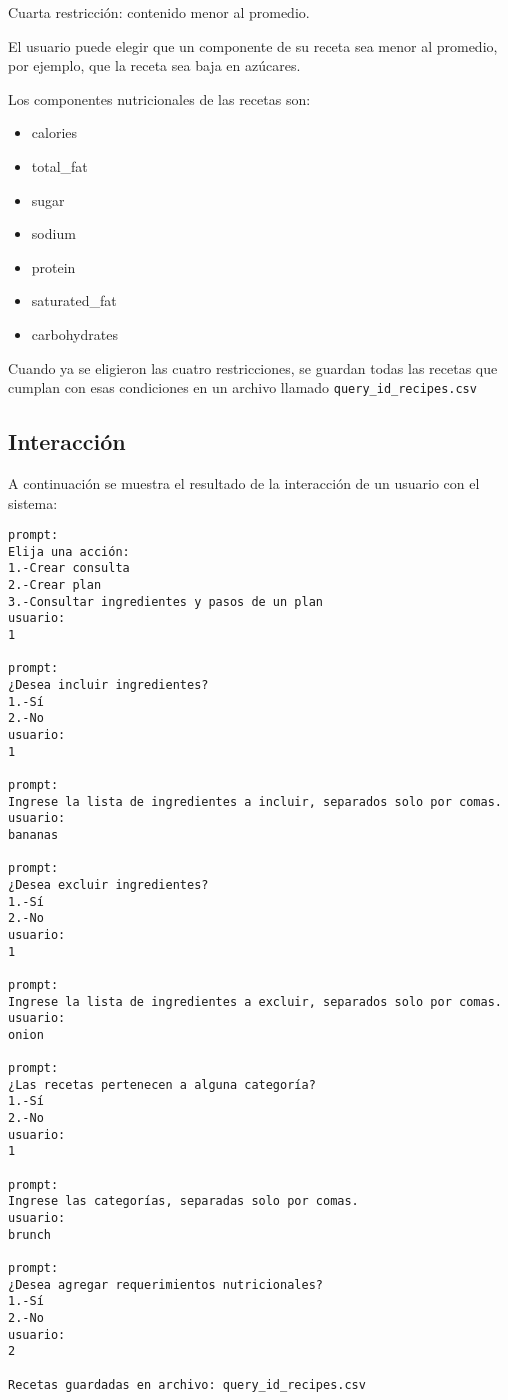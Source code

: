\documentclass{article}
\begin{document}
Cuarta restricción: contenido menor al promedio.

El usuario puede elegir que un componente de su receta sea menor al promedio, por ejemplo, que la receta sea baja en azúcares.

Los componentes nutricionales de las recetas son:
\begin{itemize}
\item calories
\item total\_fat
\item sugar
\item sodium
\item protein
\item saturated\_fat
\item carbohydrates
\end{itemize}

Cuando ya se eligieron las cuatro restricciones, se guardan todas las recetas que cumplan con esas condiciones en un archivo llamado \texttt{query\_id\_recipes.csv}

\subsection{Interacción}

A continuación se muestra el resultado de la interacción de un usuario con el sistema:

\begin{verbatim}
prompt:
Elija una acción:
1.-Crear consulta
2.-Crear plan
3.-Consultar ingredientes y pasos de un plan
usuario:
1

prompt:
¿Desea incluir ingredientes?
1.-Sí
2.-No
usuario:
1

prompt:
Ingrese la lista de ingredientes a incluir, separados solo por comas.
usuario:
bananas

prompt:
¿Desea excluir ingredientes?
1.-Sí
2.-No
usuario:
1

prompt:
Ingrese la lista de ingredientes a excluir, separados solo por comas.
usuario:
onion

prompt:
¿Las recetas pertenecen a alguna categoría?
1.-Sí
2.-No
usuario:
1

prompt:
Ingrese las categorías, separadas solo por comas.
usuario:
brunch

prompt:
¿Desea agregar requerimientos nutricionales?
1.-Sí
2.-No
usuario:
2

Recetas guardadas en archivo: query_id_recipes.csv

\end{verbatim}
\end{document}
